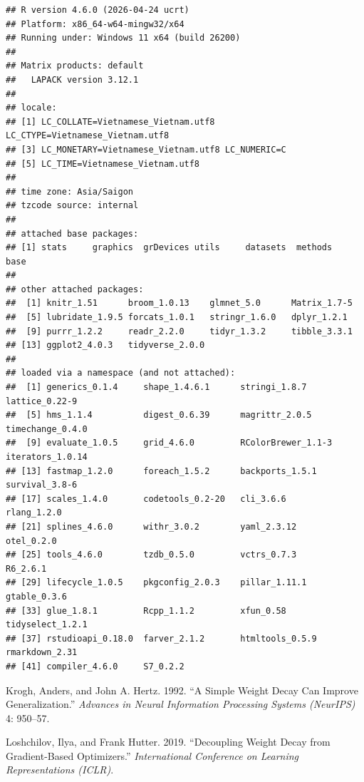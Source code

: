 \documentclass[
  11pt,
]{article}
\newlength{\cslhangindent}
\newenvironment{CSLReferences}[2] %
 {\begin{list}{}{%
  \setlength{\itemindent}{0pt}
  \setlength{\leftmargin}{0pt}
  \setlength{\parsep}{0pt}
  \ifodd #1
   \setlength{\leftmargin}{\cslhangindent}
   \setlength{\itemindent}{-1\cslhangindent}
  \fi
  \setlength{\itemsep}{#2\baselineskip}}}
 {\end{list}}
\begin{document}
\begin{verbatim}
## R version 4.6.0 (2026-04-24 ucrt)
## Platform: x86_64-w64-mingw32/x64
## Running under: Windows 11 x64 (build 26200)
## 
## Matrix products: default
##   LAPACK version 3.12.1
## 
## locale:
## [1] LC_COLLATE=Vietnamese_Vietnam.utf8  LC_CTYPE=Vietnamese_Vietnam.utf8   
## [3] LC_MONETARY=Vietnamese_Vietnam.utf8 LC_NUMERIC=C                       
## [5] LC_TIME=Vietnamese_Vietnam.utf8    
## 
## time zone: Asia/Saigon
## tzcode source: internal
## 
## attached base packages:
## [1] stats     graphics  grDevices utils     datasets  methods   base     
## 
## other attached packages:
##  [1] knitr_1.51      broom_1.0.13    glmnet_5.0      Matrix_1.7-5   
##  [5] lubridate_1.9.5 forcats_1.0.1   stringr_1.6.0   dplyr_1.2.1    
##  [9] purrr_1.2.2     readr_2.2.0     tidyr_1.3.2     tibble_3.3.1   
## [13] ggplot2_4.0.3   tidyverse_2.0.0
## 
## loaded via a namespace (and not attached):
##  [1] generics_0.1.4     shape_1.4.6.1      stringi_1.8.7      lattice_0.22-9    
##  [5] hms_1.1.4          digest_0.6.39      magrittr_2.0.5     timechange_0.4.0  
##  [9] evaluate_1.0.5     grid_4.6.0         RColorBrewer_1.1-3 iterators_1.0.14  
## [13] fastmap_1.2.0      foreach_1.5.2      backports_1.5.1    survival_3.8-6    
## [17] scales_1.4.0       codetools_0.2-20   cli_3.6.6          rlang_1.2.0       
## [21] splines_4.6.0      withr_3.0.2        yaml_2.3.12        otel_0.2.0        
## [25] tools_4.6.0        tzdb_0.5.0         vctrs_0.7.3        R6_2.6.1          
## [29] lifecycle_1.0.5    pkgconfig_2.0.3    pillar_1.11.1      gtable_0.3.6      
## [33] glue_1.8.1         Rcpp_1.1.2         xfun_0.58          tidyselect_1.2.1  
## [37] rstudioapi_0.18.0  farver_2.1.2       htmltools_0.5.9    rmarkdown_2.31    
## [41] compiler_4.6.0     S7_0.2.2
\end{verbatim}

\protect{}\label{refs}
\begin{CSLReferences}{1}{1}
Krogh, Anders, and John A. Hertz. 1992. {``A Simple Weight Decay Can
Improve Generalization.''} \emph{Advances in Neural Information
Processing Systems ({NeurIPS})} 4: 950--57.

Loshchilov, Ilya, and Frank Hutter. 2019. {``Decoupling Weight Decay
from Gradient-Based Optimizers.''} \emph{International Conference on
Learning Representations ({ICLR})}.

\end{CSLReferences}
\end{document}
